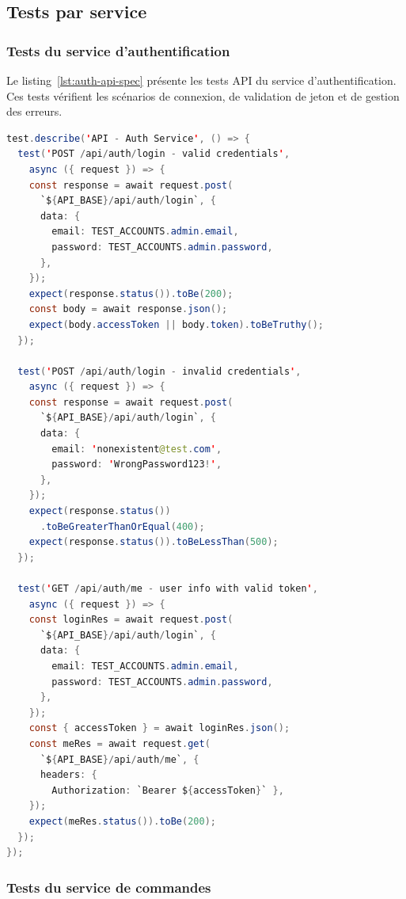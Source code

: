 \subsection{Tests par service}
\label{subsec:tests-par-service}

\subsubsection{Tests du service d'authentification}

Le listing~\ref{lst:auth-api-spec} présente les tests API du service
d'authentification. Ces tests vérifient les scénarios de connexion, de validation
de jeton et de gestion des erreurs.

\begin{lstlisting}[language=Java, caption={Tests API du service d'authentification -- auth.api.spec.ts}, label={lst:auth-api-spec}]
test.describe('API - Auth Service', () => {
  test('POST /api/auth/login - valid credentials',
    async ({ request }) => {
    const response = await request.post(
      `${API_BASE}/api/auth/login`, {
      data: {
        email: TEST_ACCOUNTS.admin.email,
        password: TEST_ACCOUNTS.admin.password,
      },
    });
    expect(response.status()).toBe(200);
    const body = await response.json();
    expect(body.accessToken || body.token).toBeTruthy();
  });

  test('POST /api/auth/login - invalid credentials',
    async ({ request }) => {
    const response = await request.post(
      `${API_BASE}/api/auth/login`, {
      data: {
        email: 'nonexistent@test.com',
        password: 'WrongPassword123!',
      },
    });
    expect(response.status())
      .toBeGreaterThanOrEqual(400);
    expect(response.status()).toBeLessThan(500);
  });

  test('GET /api/auth/me - user info with valid token',
    async ({ request }) => {
    const loginRes = await request.post(
      `${API_BASE}/api/auth/login`, {
      data: {
        email: TEST_ACCOUNTS.admin.email,
        password: TEST_ACCOUNTS.admin.password,
      },
    });
    const { accessToken } = await loginRes.json();
    const meRes = await request.get(
      `${API_BASE}/api/auth/me`, {
      headers: {
        Authorization: `Bearer ${accessToken}` },
    });
    expect(meRes.status()).toBe(200);
  });
});
\end{lstlisting}

\subsubsection{Tests du service de commandes}

